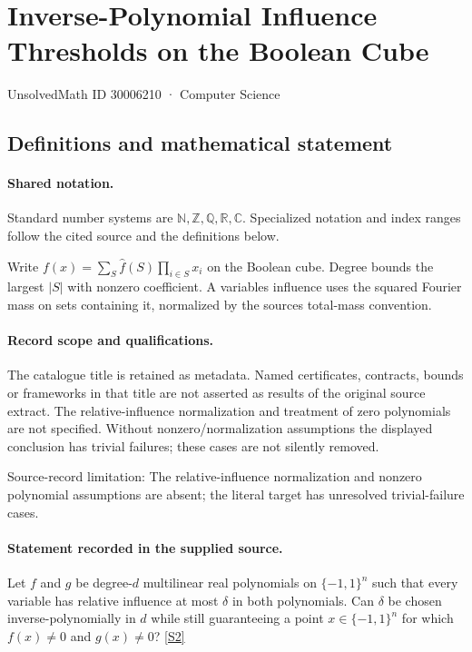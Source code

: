 \documentclass[11pt]{article}
\newcommand{\sref}[2]{\hyperlink{source:#1:#2}{[S#2]}}
\begin{document}
\setcounter{section}{30006209}
\section{Inverse-Polynomial Influence Thresholds on the Boolean Cube}\label{30006210}
{\small\sffamily UnsolvedMath ID 30006210 · Computer Science}
\subsection{Definitions and mathematical statement}

\paragraph{Shared notation.}Standard number systems are $\mathbb N,\mathbb Z,\mathbb Q,\mathbb R,\mathbb C$. Specialized notation and index ranges follow the cited source and the definitions below.


Write $f(x)=\sum_S\widehat f(S)\prod_{i\in S}x_i$ on the Boolean cube. Degree bounds the largest $|S|$ with nonzero coefficient. A variable\textquotesingle s influence uses the squared Fourier mass on sets containing it, normalized by the source\textquotesingle s total-mass convention.
\paragraph{Record scope and qualifications.}
The catalogue title is retained as metadata. Named certificates, contracts, bounds or frameworks in that title are not asserted as results of the original source extract.
The relative-influence normalization and treatment of zero polynomials are not specified. Without nonzero/normalization assumptions the displayed conclusion has trivial failures; these cases are not silently removed.

Source-record limitation: The relative-influence normalization and nonzero polynomial assumptions are absent; the literal target has unresolved trivial-failure cases.
\paragraph{Statement recorded in the supplied source.}
Let $f$ and $g$ be degree-$d$ multilinear real polynomials on $\{-1,1\}^n$ such that every variable has relative influence at most $\delta$ in both polynomials. Can $\delta$ be chosen inverse-polynomially in $d$ while still guaranteeing a point $x\in\{-1,1\}^n$ for which $f(x)\neq0$ and $g(x)\neq0$? \sref{30006210}{2}
\end{document}
